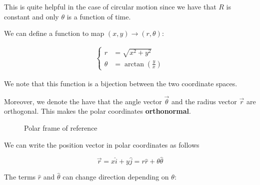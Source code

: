 \documentclass[10pt]{extarticle}
\begin{document}
This is quite helpful in the case of circular motion since we have that $R$ is constant
and only $\theta$ is a function of time.

We can define a function to map $(x, y) \to (r, \theta)$:

\begin{align*}
    \begin{cases}
        r      & = \sqrt{x^2 + y^2}                \\
        \theta & = \arctan\left(\frac{y}{x}\right)
    \end{cases}
\end{align*}

We note that this function is a bijection between the two coordinate spaces.

Moreover, we denote the have that the angle vector $\vec \theta$
and the radius vector $\vec r$ are orthogonal. This makes the polar coordinates \textbf{orthonormal}.

\begin{figure}[H]
    \centering

    \caption{Polar frame of reference}
    \label{fig:polar_frame}
\end{figure}

We can write the position vector in polar coordinates as follows

$$
    \vec r = x \hat i + y \hat j = r \hat r + \theta \hat \theta
$$

The terms $\hat r$ and $\hat \theta$ can change direction depending on $\theta$:
\end{document}
